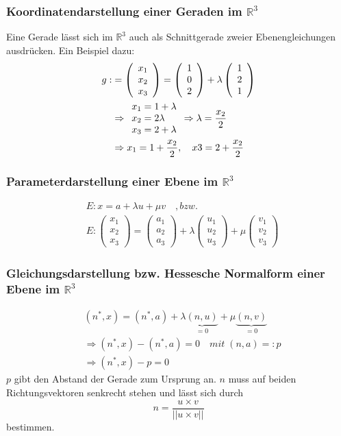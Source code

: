 \documentclass[12pt,a4paper]{report}%
\numberwithin{equation}{section}
\newcommand{\R}{\mathbb{R}} %
\def\vecT#1{\left(\begin{array}{c} #1 \end{array}\right)}
\numberwithin{equation}{subsection}
\begin{document}
    \subsubsection{Koordinatendarstellung einer Geraden im $\R^3$}
    Eine Gerade lässt sich im $\R^3$ auch als Schnittgerade zweier Ebenengleichungen ausdrücken. Ein Beispiel dazu:
    \begin{align*}
      g: &= \vecT{x_1 \\ x_2 \\ x_3} = \vecT{1 \\ 0 \\ 2} + \lambda \vecT{1\\2\\1} \\
      &\Rightarrow
      \begin{array}{l l l}
        x_1 = 1 + \lambda \\
        x_2 = 2\lambda \\
        x_3 = 2 + \lambda
      \end{array}
      \Rightarrow \lambda = \frac{x_2}{2}\\
      &\Rightarrow x_1 = 1 + \frac{x_2}{2},\quad x3 = 2 + \frac{x_2}{2}
    \end{align*}
    \subsubsection{Parameterdarstellung einer Ebene im $\R^3$}
    \begin{align}
      &E: x = a + \lambda u + \mu v \quad ,bzw. \nonumber \\
      &E: \vecT{x_1 \\ x_2 \\ x_3} = \vecT{a_1 \\ a_2 \\ a_3} + \lambda \vecT{u_1 \\ u_2 \\ u_3} + \mu \vecT{v_1 \\ v_2 \\ v_3}
    \end{align}        
    \subsubsection{Gleichungsdarstellung bzw. Hessesche Normalform einer Ebene im $\R^3$}
    \begin{align}
    &(n^*,x) = (n^*,a) + \lambda \underbrace{(n,u)}_{=0} + \mu \underbrace{(n,v)}_{=0} \nonumber \\
    &\Rightarrow (n^*,x) - (n^*,a) = 0 \quad mit \; (n,a) =: p \nonumber \\
    &\Rightarrow (n^*,x) - p = 0
    \end{align}
    $p$ gibt den Abstand der Gerade zum Ursprung an. $n$ muss auf beiden Richtungsvektoren  senkrecht stehen und lässt sich durch
    \begin{equation}
      n = \frac{u \times v}{|| u \times v||}
    \end{equation}
    bestimmen.
  
\end{document}
